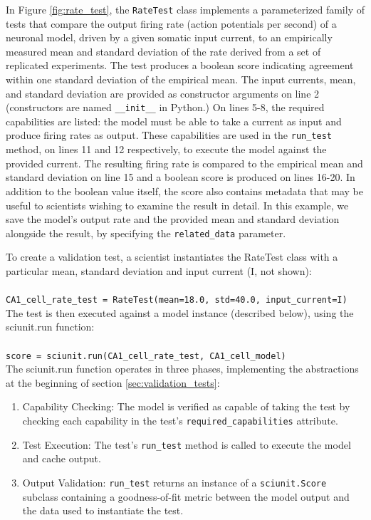 \documentclass[11pt,letterpaper]{article}
\begin{document}
In Figure \ref{fig:rate_test}, the \verb|RateTest| class implements a parameterized family of tests that compare the output firing rate (action potentials per second) of a neuronal model, driven by a given somatic input current, to an empirically measured mean and standard deviation of the rate derived from a set of replicated experiments. The test produces a boolean score indicating agreement within one standard deviation of the empirical mean. The input currents, mean, and standard deviation are provided as constructor arguments on line 2 (constructors are named \verb|__init__| in Python.) On lines 5-8, the required capabilities are listed: the model must be able to take a current as input and produce firing rates as output. These capabilities are used in the \verb|run_test| method, on lines 11 and 12 respectively, to execute the model against the provided current. The resulting firing rate is compared to the empirical mean and standard deviation on line 15 and a boolean score is produced on lines 16-20. In addition to the boolean value itself, the score also contains metadata that may be useful to scientists wishing to examine the result in detail. In this example, we save the model's output rate and the provided mean and standard deviation alongside the result, by specifying the \verb|related_data| parameter.

To create a validation test, a scientist instantiates the RateTest class with a particular mean, standard deviation and input current (I, not shown):
\\
\\
\verb|CA1_cell_rate_test = RateTest(mean=18.0, std=40.0, input_current=I)|
\\

The test is then executed against a model instance (described below), using the sciunit.run function:
\\
\\
\verb|score = sciunit.run(CA1_cell_rate_test, CA1_cell_model)|
\\

The sciunit.run function operates in three phases, implementing the abstractions at the beginning of section \ref{sec:validation_tests}:
\begin{enumerate}
\item Capability Checking: The model is verified as capable of taking the test by checking each capability in the test's \verb|required_capabilities| attribute.
\item Test Execution: The test's \verb|run_test| method is called to execute the model and cache output.
\item Output Validation: \verb|run_test| returns an instance of a \verb|sciunit.Score| subclass containing a goodness-of-fit metric between the model output and the data used to instantiate the test.
\end{enumerate}
\end{document}
